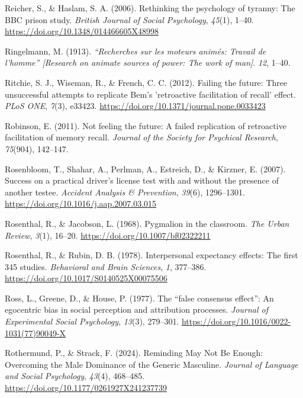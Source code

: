 \documentclass[
  letterpaper,
]{book}
\newlength{\cslhangindent}
\newenvironment{CSLReferences}[2] %
 {\begin{list}{}{%
  \setlength{\itemindent}{0pt}
  \setlength{\leftmargin}{0pt}
  \setlength{\parsep}{0pt}
  \ifodd #1
   \setlength{\leftmargin}{\cslhangindent}
   \setlength{\itemindent}{-1\cslhangindent}
  \fi
  \setlength{\itemsep}{#2\baselineskip}}}
 {\end{list}}
\begin{document}
\begin{CSLReferences}{1}{0}
Reicher, S., \& Haslam, S. A. (2006). Rethinking the psychology of
tyranny: {The} {BBC} prison study. \emph{British Journal of Social
Psychology}, \emph{45}(1), 1--40.
\url{https://doi.org/10.1348/014466605X48998}

Ringelmann, M. (1913). \emph{{``{Recherches} sur les moteurs animés:
{Travail} de l'homme''} {[}{Research} on animate sources of power: {The}
work of man{]}}. \emph{12}, 1--40.

Ritchie, S. J., Wiseman, R., \& French, C. C. (2012). {Failing the
future: Three unsuccessful attempts to replicate Bem's 'retroactive
facilitation of recall' effect}. \emph{PLoS ONE}, \emph{7}(3), e33423.
\url{https://doi.org/10.1371/journal.pone.0033423}

Robinson, E. (2011). Not feeling the future: A failed replication of
retroactive facilitation of memory recall. \emph{Journal of the Society
for Psychical Research}, \emph{75}(904), 142--147.

Rosenbloom, T., Shahar, A., Perlman, A., Estreich, D., \& Kirzner, E.
(2007). Success on a practical driver's license test with and without
the presence of another testee. \emph{Accident Analysis \& Prevention},
\emph{39}(6), 1296--1301.
\url{https://doi.org/10.1016/j.aap.2007.03.015}

Rosenthal, R., \& Jacobson, L. (1968). Pygmalion in the classroom.
\emph{The Urban Review}, \emph{3}(1), 16--20.
\url{https://doi.org/10.1007/bf02322211}

Rosenthal, R., \& Rubin, D. B. (1978). Interpersonal expectancy effects:
The first 345 studies. \emph{Behavioral and Brain Sciences}, \emph{1},
377--386. \url{https://doi.org/10.1017/S0140525X00075506}

Ross, L., Greene, D., \& House, P. (1977). The {``false consensus
effect''}: {An} egocentric bias in social perception and attribution
processes. \emph{Journal of Experimental Social Psychology},
\emph{13}(3), 279--301.
\url{https://doi.org/10.1016/0022-1031(77)90049-X}

Rothermund, P., \& Strack, F. (2024). Reminding {May} {Not} {Be}
{Enough}: {Overcoming} the {Male} {Dominance} of the {Generic}
{Masculine}. \emph{Journal of Language and Social Psychology},
\emph{43}(4), 468--485. \url{https://doi.org/10.1177/0261927X241237739}


\end{CSLReferences}
\end{document}
